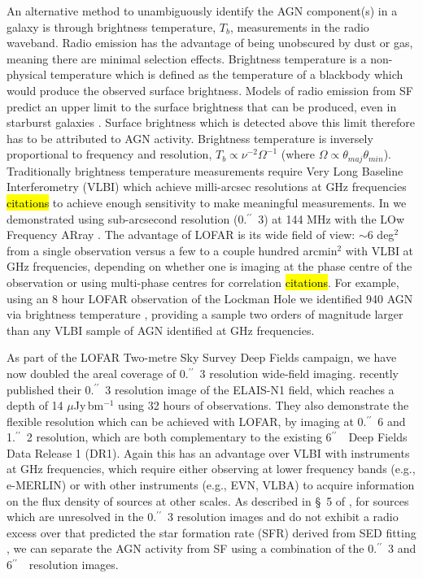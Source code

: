 \documentclass[usenatbib,fleqn,letters]{mnras}
\newcommand{\sarc}{$^{\prime\prime}\!\!$}
\begin{document}


An alternative method to unambiguously identify the AGN component(s) in a galaxy is through brightness temperature, $T_b$, measurements in the radio waveband. Radio emission has the advantage of being unobscured by dust or gas, meaning there are minimal selection effects. Brightness temperature is a non-physical temperature which is defined as the temperature of a blackbody which would produce the observed surface brightness. Models of radio emission from SF predict an upper limit to the surface brightness that can be produced, even in starburst galaxies \citep{condon_radio_1992}. Surface brightness which is detected above this limit therefore has to be attributed to AGN activity. Brightness temperature is inversely proportional to frequency and resolution, $T_b \propto \nu^{-2}\Omega^{-1}$ (where $\Omega \propto \theta_{maj}\theta_{min}$). Traditionally brightness temperature measurements require Very Long Baseline Interferometry (VLBI) which achieve milli-arcsec resolutions at GHz frequencies \hl{citations} to achieve enough sensitivity to make meaningful measurements. In \cite[][hereafter, \hl{M22}]{morabito_identifying_2022} we demonstrated using sub-arcsecond resolution (0.\sarc\ 3) at 144 MHz with the LOw Frequency ARray \citep[LOFAR;][]{van_haarlem_lofar:_2013}. The advantage of LOFAR is its wide field of view: $\sim$6 deg$^2$ from a single observation versus a few to a couple hundred arcmin$^2$ with VLBI at GHz frequencies, depending on whether one is imaging at the phase centre of the observation or using multi-phase centres for correlation \hl{citations}. For example, using an 8 hour LOFAR observation of the Lockman Hole \citep{sweijen_deep_2022} we identified 940 AGN via brightness temperature , providing a sample two orders of magnitude larger than any VLBI sample of AGN identified at GHz frequencies. 

As part of the LOFAR Two-metre Sky Survey Deep Fields \citep{sabater_lofar_2021,tasse_lofar_2021} campaign, we have now doubled the areal coverage of 0.\sarc\ 3 resolution wide-field imaging. \cite{de_jong_into_2024} recently published their 0.\sarc\ 3 resolution image of the ELAIS-N1 field, which reaches a depth of 14 $\mu$Jy$\,$bm$^{-1}$ using 32 hours of observations. They also demonstrate the flexible resolution which can be achieved with LOFAR, by imaging at 0.\sarc\ 6 and 1.\sarc\ 2 resolution, which are both complementary to the existing 6\sarc\ \ Deep Fields Data Release 1 (DR1). Again this has an advantage over VLBI with instruments at GHz frequencies, which require either observing at lower frequency bands (e.g., e-MERLIN) or with other instruments (e.g., EVN, VLBA) to acquire information on the flux density of sources at other scales. As described in \S~5 of , for sources which are unresolved in the 0.\sarc\ 3 resolution images and do not exhibit a radio excess over that predicted the star formation rate (SFR) derived from SED fitting \citep[see][for more details]{best_lofar_2023}, we can separate the AGN activity from SF using a combination of the 0.\sarc\ 3 and 6\sarc\ \ resolution images. 
\end{document}
